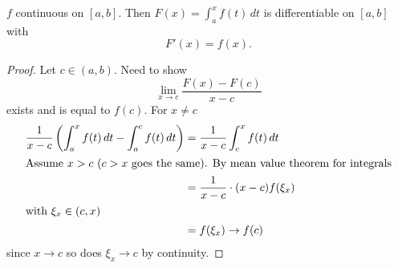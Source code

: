 \begin{theorem}\label{thm:ftoc}
    $f$ continuous on $[a, b]$.
    Then $F(x) = \int_{a}^{x}f(t)\,dt$ is differentiable on $[a, b]$ with
    \[
    F'(x) = f(x).
    \]
\end{theorem}
\begin{proof}
    Let $c \in (a, b)$.
    Need to show
    \[
    \lim_{x \to c}\frac{F(x) - F(c)}{x - c}
    \]
    exists and is equal to $f(c)$.
    For $x \neq c$
    \begin{align*}
        \frac{1}{x - c}\left(\int_{a}^{x}f(t)\,dt - \int_{a}^{c}f(t)\,dt\right) &= \frac{1}{x - c}\int_{c}^{x}f(t)\,dt \\
        \intertext{Assume $x > c$
        ($c > x$ goes the same).
        By mean value theorem for integrals}
        &= \frac{1}{x - c}\cdot (x - c)f(\xi_x) \\
        \intertext{with $\xi_x \in (c, x)$}
        &= f(\xi_x) \to f(c)
    \end{align*}
    since $x \to c$ so does $\xi_x \to c$ by continuity.
\end{proof}

